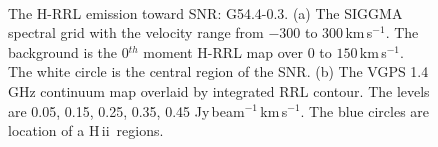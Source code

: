 \documentclass[manuscript]{aastex61}
\newcommand{\hii}{{\rm H\,}{{\sc ii}}}
\newcommand{\kms}{\,km\,s$^{-1}$}
\begin{document}
\begin{figure}[H]
	\centering
	\\
	\caption{The H-RRL emission toward SNR: G54.4-0.3.
	(a) The SIGGMA spectral grid with the velocity range from $-300$ to $300$\kms.
	The background is the 0$^{th}$ moment H-RRL map over $0$ to $150$\kms.
	The white circle is the central region of the SNR.
	(b) The VGPS 1.4 GHz continuum map overlaid by integrated RRL contour.
	The levels are 0.05, 0.15, 0.25, 0.35, 0.45 Jy\,beam$^{-1}$\kms.
	The blue circles are location of a \hii\ regions.
	}
	\label{fig_snr-g544}
\end{figure}
\end{document}
